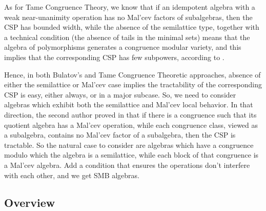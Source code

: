 \documentclass[11pt]{amsart}
\theoremstyle{definition}
\begin{document}
As for Tame Congruence Theory, we know that if an idempotent algebra with a weak near-unanimity operation has no Mal'cev factors of subalgebras, then the CSP has bounded width, while the absence of the semilattice type, together with a technical condition (the absence of tails in the minimal sets) means that the algebra of polymorphisms generates a congruence modular variety, and this implies that the corresponding CSP has few subpowers, according to \cite{Barto-Valerioteconj}. 

Hence, in both Bulatov's and Tame Congruence Theoretic approaches, absence of either the semilattice or Mal'cev case implies the tractability of the corresponding CSP is easy, either always, or in a major subcase. So, we need to consider algebras which exhibit both the semilattice and Mal'cev local behavior. In that direction, the second author proved in \cite{MMontop} that if there is a congruence such that its quotient algebra has a Mal'cev operation, while each congruence class, viewed as a subalgebra, contains no Mal'cev factor of a subalgebra, then the CSP is tractable. So the natural case to consider are algebras which have a congruence modulo which the algebra is a semilattice, while each block of that congruence is a Mal'cev algebra. Add a condition that ensures the operations don't interfere with each other, and we get SMB algebras.

\subsection{Overview}
\end{document}
